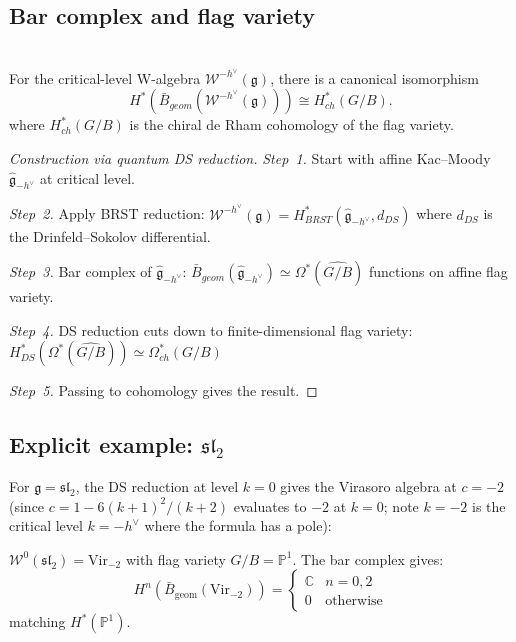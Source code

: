 \subsection{Bar complex and flag variety}

\begin{theorem}
\label{thm:w-algebra-bar-flag}
\leavevmode\\
For the critical-level W-algebra $\mathcal{W}^{-h^\vee}(\mathfrak{g})$,
there is a canonical isomorphism
\[
H^*(\bar{B}_{geom}(\mathcal{W}^{-h^\vee}(\mathfrak{g}))) \cong H^*_{ch}(G/B).
\]
where $H^*_{ch}(G/B)$ is the chiral de Rham cohomology of the flag variety.
\end{theorem}

\begin{proof}[Construction via quantum DS reduction]
\emph{Step~1.} Start with affine Kac--Moody $\hat{\mathfrak{g}}_{-h^\vee}$ at critical level.

\emph{Step~2.} Apply BRST reduction:
$\mathcal{W}^{-h^\vee}(\mathfrak{g}) = H^*_{BRST}(\hat{\mathfrak{g}}_{-h^\vee}, d_{DS})$
where $d_{DS}$ is the Drinfeld--Sokolov differential.

\emph{Step~3.} Bar complex of $\hat{\mathfrak{g}}_{-h^\vee}$:
$\bar{B}_{geom}(\hat{\mathfrak{g}}_{-h^\vee}) \simeq \Omega^*(\widehat{G/B})$
functions on affine flag variety.

\emph{Step~4.} DS reduction cuts down to finite-dimensional flag variety:
$H^*_{DS}(\Omega^*(\widehat{G/B})) \simeq \Omega^*_{ch}(G/B)$

\emph{Step~5.} Passing to cohomology gives the result.
\end{proof}
 
\subsection{\texorpdfstring{Explicit example: $\mathfrak{sl}_2$}{Explicit example: sl-2}}
 
For $\mathfrak{g} = \mathfrak{sl}_2$, the DS reduction at level $k=0$ gives the Virasoro algebra at $c = -2$ (since $c = 1 - 6(k+1)^2/(k+2)$ evaluates to $-2$ at $k=0$; note $k=-2$ is the critical level $k = -h^\vee$ where the formula has a pole):

\begin{proposition}
\label{prop:sl2-w-algebra-flag}
$\mathcal{W}^{0}(\mathfrak{sl}_2) = \text{Vir}_{-2}$ with flag variety $G/B = \mathbb{P}^1$. The bar complex gives:
\[
H^n(\bar{B}_{\text{geom}}(\text{Vir}_{-2})) = 
\begin{cases}
\mathbb{C} & n = 0, 2 \\
0 & \text{otherwise}
\end{cases}
\]
matching $H^*(\mathbb{P}^1)$.
\end{proposition}
 

